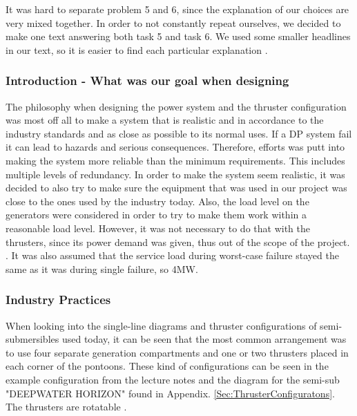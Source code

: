 
It was hard to separate problem 5 and 6, since the explanation of our choices are very mixed together. In order to not constantly repeat ourselves, we decided to make one text answering both task 5 and task 6. We used some smaller headlines in our text, so it is easier to find each particular explanation . 

\subsubsection*{Introduction - What was our goal when designing}
The philosophy when designing the power system and the thruster configuration was most off all to make a system that is realistic and in accordance to the industry standards and as close as possible to its normal uses. If a DP system fail it can lead to hazards and serious consequences. Therefore, efforts was putt into making the system more reliable than the minimum requirements. This includes multiple levels of redundancy. In order to make the system seem realistic, it was decided to also try to make sure the equipment that was used in our project was close to the ones used by the industry today. Also, the load level on the generators were considered in order to try to make them work within a reasonable load level. However, it was not necessary to do that with the thrusters, since its power demand was given, thus out of the scope of the project. . It was also assumed that the service load during worst-case failure stayed the same as it was during single failure, so 4MW.


\subsubsection*{Industry Practices}
When looking into the single-line diagrams and thruster configurations of semi-submersibles used today, it can be seen that the most common arrangement was to use four separate generation compartments and one or two thrusters placed in each corner of the pontoons. These kind of configurations can be seen in the example configuration from the lecture notes and the diagram for the semi-sub "DEEPWATER HORIZON" found in Appendix. \ref{Sec:ThrusterConfiguratons}. The thrusters are rotatable . 
   


